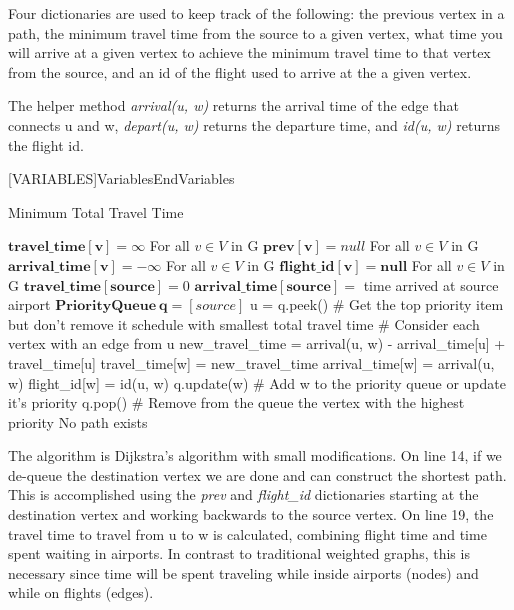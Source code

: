 \documentclass[11pt]{article}
\begin{document}
	Four dictionaries are used to keep track of the following: the previous vertex in a path, the minimum travel time from the source to a given vertex, what time you will arrive at a given vertex to achieve the minimum travel time to that vertex from the source, and an id of the flight used to arrive at the a given vertex.
	
	The helper method \textit{arrival(u, w)} returns the arrival time of the edge that connects u and w, \textit{depart(u, w)} returns the departure time, and \textit{id(u, w)} returns the flight id.
	
	[VARIABLES]{Variables}{EndVariables}
   {\algorithmicvariables}
   {\algorithmicend\ \algorithmicvariables}

\begin{algorithm}[H]
\caption{Minimum Total Travel Time}
\label{CHalgorithm}
\begin{algorithmic}[1]
\Variables
\State $\mathbf{travel\_time[v]} = \infty$ For all $v \in V$ in G
\State $\mathbf{prev[v]} = null$ For all $v \in V$ in G
\State $\mathbf{arrival\_time[v]} = -\infty$ For all $v \in V$ in G
\State $\mathbf{flight\_id[v] = null}$ For all $v \in V$ in G
\State
\State $\mathbf{travel\_time[source]} = 0$
\State $\mathbf{arrival\_time[source]} = $ time arrived at source airport
\State $\mathbf{PriorityQueue\ q} = [source]$
\EndVariables
\State
{}
\State u = q.peek()  \# Get the top priority item but don't remove it
\State \Return schedule with smallest total travel time
\EndIf
{} \# Consider each vertex with an edge from u
\State new\_travel\_time = arrival(u, w) - arrival\_time[u] + travel\_time[u]
\State travel\_time[w] = new\_travel\_time
\State arrival\_time[w] = arrival(u, w)
\State flight\_id[w] = id(u, w)
\State 
\State q.update(w) \# Add w to the priority queue or update it's priority
\EndIf
\EndFor
\State q.pop() \# Remove from the queue the vertex with the highest priority
\EndWhile
\State \Return No path exists
\EndProcedure
\end{algorithmic}
\end{algorithm}

The algorithm is Dijkstra's algorithm with small modifications. On line 14, if we de-queue the destination vertex we are done and can construct the shortest path. This is accomplished using the \textit{prev} and \textit{flight\_id} dictionaries starting at the destination vertex and working backwards to the source vertex. On line 19, the travel time to travel from u to w is calculated, combining flight time and time spent waiting in airports. In contrast to traditional weighted graphs, this is necessary since time will be spent traveling while inside airports (nodes) and while on flights (edges).
\end{document}
